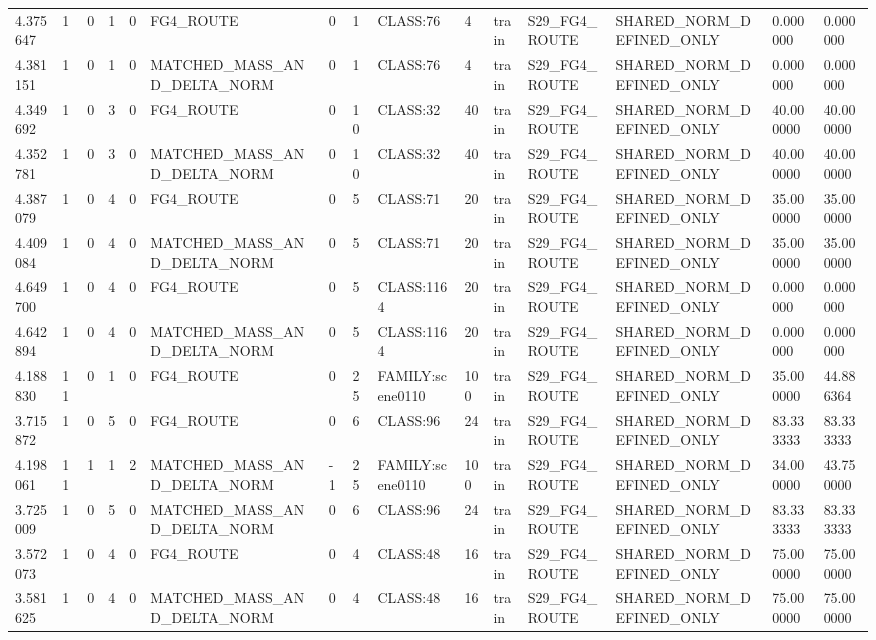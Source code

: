 \begin{tabular}{lllllllllllllll}
4.375647 & 1 & 0 & 1 & 0 & FG4\_ROUTE & 0 & 1 & CLASS:76 & 4 & train & S29\_FG4\_ROUTE & SHARED\_NORM\_DEFINED\_ONLY & 0.000000 & 0.000000 \\
4.381151 & 1 & 0 & 1 & 0 & MATCHED\_MASS\_AND\_DELTA\_NORM & 0 & 1 & CLASS:76 & 4 & train & S29\_FG4\_ROUTE & SHARED\_NORM\_DEFINED\_ONLY & 0.000000 & 0.000000 \\
4.349692 & 1 & 0 & 3 & 0 & FG4\_ROUTE & 0 & 10 & CLASS:32 & 40 & train & S29\_FG4\_ROUTE & SHARED\_NORM\_DEFINED\_ONLY & 40.000000 & 40.000000 \\
4.352781 & 1 & 0 & 3 & 0 & MATCHED\_MASS\_AND\_DELTA\_NORM & 0 & 10 & CLASS:32 & 40 & train & S29\_FG4\_ROUTE & SHARED\_NORM\_DEFINED\_ONLY & 40.000000 & 40.000000 \\
4.387079 & 1 & 0 & 4 & 0 & FG4\_ROUTE & 0 & 5 & CLASS:71 & 20 & train & S29\_FG4\_ROUTE & SHARED\_NORM\_DEFINED\_ONLY & 35.000000 & 35.000000 \\
4.409084 & 1 & 0 & 4 & 0 & MATCHED\_MASS\_AND\_DELTA\_NORM & 0 & 5 & CLASS:71 & 20 & train & S29\_FG4\_ROUTE & SHARED\_NORM\_DEFINED\_ONLY & 35.000000 & 35.000000 \\
4.649700 & 1 & 0 & 4 & 0 & FG4\_ROUTE & 0 & 5 & CLASS:1164 & 20 & train & S29\_FG4\_ROUTE & SHARED\_NORM\_DEFINED\_ONLY & 0.000000 & 0.000000 \\
4.642894 & 1 & 0 & 4 & 0 & MATCHED\_MASS\_AND\_DELTA\_NORM & 0 & 5 & CLASS:1164 & 20 & train & S29\_FG4\_ROUTE & SHARED\_NORM\_DEFINED\_ONLY & 0.000000 & 0.000000 \\
4.188830 & 11 & 0 & 1 & 0 & FG4\_ROUTE & 0 & 25 & FAMILY:scene0110 & 100 & train & S29\_FG4\_ROUTE & SHARED\_NORM\_DEFINED\_ONLY & 35.000000 & 44.886364 \\
3.715872 & 1 & 0 & 5 & 0 & FG4\_ROUTE & 0 & 6 & CLASS:96 & 24 & train & S29\_FG4\_ROUTE & SHARED\_NORM\_DEFINED\_ONLY & 83.333333 & 83.333333 \\
4.198061 & 11 & 1 & 1 & 2 & MATCHED\_MASS\_AND\_DELTA\_NORM & -1 & 25 & FAMILY:scene0110 & 100 & train & S29\_FG4\_ROUTE & SHARED\_NORM\_DEFINED\_ONLY & 34.000000 & 43.750000 \\
3.725009 & 1 & 0 & 5 & 0 & MATCHED\_MASS\_AND\_DELTA\_NORM & 0 & 6 & CLASS:96 & 24 & train & S29\_FG4\_ROUTE & SHARED\_NORM\_DEFINED\_ONLY & 83.333333 & 83.333333 \\
3.572073 & 1 & 0 & 4 & 0 & FG4\_ROUTE & 0 & 4 & CLASS:48 & 16 & train & S29\_FG4\_ROUTE & SHARED\_NORM\_DEFINED\_ONLY & 75.000000 & 75.000000 \\
3.581625 & 1 & 0 & 4 & 0 & MATCHED\_MASS\_AND\_DELTA\_NORM & 0 & 4 & CLASS:48 & 16 & train & S29\_FG4\_ROUTE & SHARED\_NORM\_DEFINED\_ONLY & 75.000000 & 75.000000 \\

\end{tabular}
